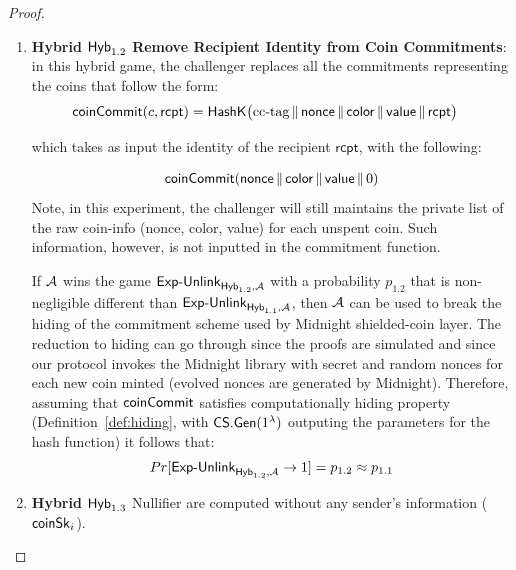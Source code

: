 \begin{proof}
\begin{enumerate}
     If $\Adv$ wins the game $\unlinkgame_{\hybrid_{1.1},\Adv}$ with a probability $p_{1.1}$ that is non-negligible different than $\unlinkgame_{\hybrid_0,\Adv}$,  then $\Adv$ can be used to break the zk property of each proof.   Therefore, due the zero-knowledge Property (\S~\ref{def:nizk}), it follows:

    $$Pr[\unlinkgame_{\hybrid_{1.1},\Adv} \rightarrow 1] = p_{1.1}\approx_{\negl(\lambda)} p_0$$

    \item \textbf{Hybrid $\mathsf{Hyb}_{1.2}$} \textbf{Remove Recipient Identity from Coin Commitments}: in this hybrid game, the challenger replaces all the commitments representing the coins that follow the form:
\begin{align*}
{\mathsf{coinCommit}(c, \mathsf{rcpt})} &= \mathsf{HashK}\bigl(\text{cc-tag} \,\|\, \mathsf{nonce} \,\|\,
  \mathsf{color} \,\|\, \mathsf{value} \,\|\, \mathsf{rcpt}\bigr)
\end{align*}

which takes as input the identity of the recipient  $\mathsf{rcpt}$, with  the following:

\begin{align*}
{\mathsf{coinCommit}(\mathsf{nonce} \,\|\,\mathsf{color} \,\|\,\mathsf{value} \,\|\,0)}
\end{align*}
Note, in this experiment, the challenger will still maintains the private list of the raw coin-info (nonce, color, value) for each unspent coin. Such information, however,  is not inputted  in the commitment function.

     If $\Adv$ wins the game $\mathsf{Exp\text{-}Unlink}_{\mathsf{Hyb}_{1.2},\mathcal{A}}$ with a probability $p_{1.2}$ that is non-negligible different than $\unlinkgame_{\hybrid_{1.1},\Adv}$,  then $\Adv$ can be used to  break the hiding of the commitment scheme used by Midnight shielded-coin layer.  The reduction to hiding can go through since the proofs are simulated and since our protocol invokes the Midnight library  with secret and random nonces for each new coin minted (evolved nonces are generated by Midnight).  Therefore,  assuming that $\mathsf{coinCommit}$ satisfies computationally hiding property (Definition~\ref{def:hiding}, with $\mathsf{CS.Gen}(1^{\lambda})$ outputing the parameters for the hash function) it follows that: $$Pr[\mathsf{Exp\text{-}Unlink}_{\mathsf{Hyb}_{1.2},\mathcal{A}} \rightarrow 1]=  p_{1.2}\approx p_{1.1}$$


 \item \textbf{Hybrid $\mathsf{Hyb}_{1.3}$} Nullifier are computed without any sender's information ($\mathsf{coinSk}_i$).


\end{enumerate}
\end{proof}

